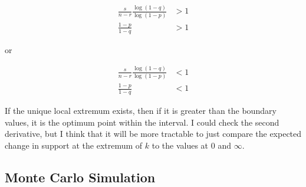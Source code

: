 \documentclass{article}
\begin{document}
\begin{align*}
\frac s{n-r} \frac{ \log (1 - q)}{\log (1 - p)} & > 1\\
\frac{1 - p}{1 - q} & > 1
\end{align*}

or 

\begin{align*}
\frac s{n-r} \frac{ \log (1 - q)}{\log (1 - p)} & < 1\\
\frac{1 - p}{1 - q} & < 1
\end{align*}

If the unique local extremum exists, then if it is greater than
	the boundary values, it is the optimum point within the interval.
I could check the second derivative, but I think that it will 
	be more tractable to just compare the expected change in support at the 
	extremum of $k$ to the values at $0$ and $\infty$.

%	
%	
%	
%	
%	
%	

\subsection{Monte Carlo Simulation}
\end{document}
